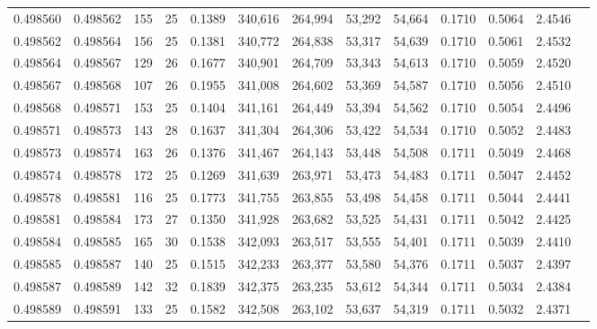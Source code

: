 \begin{tabular}{rrrrrrrrrrrrr}
0.498560 & 0.498562 & 155 &  25 &                                     0.1389 & 340,616 & 264,994 &  53,292 &  54,664 & 0.1710 & 0.5064 & 2.4546 \\
0.498562 & 0.498564 & 156 &  25 &                                     0.1381 & 340,772 & 264,838 &  53,317 &  54,639 & 0.1710 & 0.5061 & 2.4532 \\
0.498564 & 0.498567 & 129 &  26 &                                     0.1677 & 340,901 & 264,709 &  53,343 &  54,613 & 0.1710 & 0.5059 & 2.4520 \\
0.498567 & 0.498568 & 107 &  26 &                                     0.1955 & 341,008 & 264,602 &  53,369 &  54,587 & 0.1710 & 0.5056 & 2.4510 \\
0.498568 & 0.498571 & 153 &  25 &                                     0.1404 & 341,161 & 264,449 &  53,394 &  54,562 & 0.1710 & 0.5054 & 2.4496 \\
0.498571 & 0.498573 & 143 &  28 &                                     0.1637 & 341,304 & 264,306 &  53,422 &  54,534 & 0.1710 & 0.5052 & 2.4483 \\
0.498573 & 0.498574 & 163 &  26 &                                     0.1376 & 341,467 & 264,143 &  53,448 &  54,508 & 0.1711 & 0.5049 & 2.4468 \\
0.498574 & 0.498578 & 172 &  25 &                                     0.1269 & 341,639 & 263,971 &  53,473 &  54,483 & 0.1711 & 0.5047 & 2.4452 \\
0.498578 & 0.498581 & 116 &  25 &                                     0.1773 & 341,755 & 263,855 &  53,498 &  54,458 & 0.1711 & 0.5044 & 2.4441 \\
0.498581 & 0.498584 & 173 &  27 &                                     0.1350 & 341,928 & 263,682 &  53,525 &  54,431 & 0.1711 & 0.5042 & 2.4425 \\
0.498584 & 0.498585 & 165 &  30 &                                     0.1538 & 342,093 & 263,517 &  53,555 &  54,401 & 0.1711 & 0.5039 & 2.4410 \\
0.498585 & 0.498587 & 140 &  25 &                                     0.1515 & 342,233 & 263,377 &  53,580 &  54,376 & 0.1711 & 0.5037 & 2.4397 \\
0.498587 & 0.498589 & 142 &  32 &                                     0.1839 & 342,375 & 263,235 &  53,612 &  54,344 & 0.1711 & 0.5034 & 2.4384 \\
0.498589 & 0.498591 & 133 &  25 &                                     0.1582 & 342,508 & 263,102 &  53,637 &  54,319 & 0.1711 & 0.5032 & 2.4371 \\

\end{tabular}
